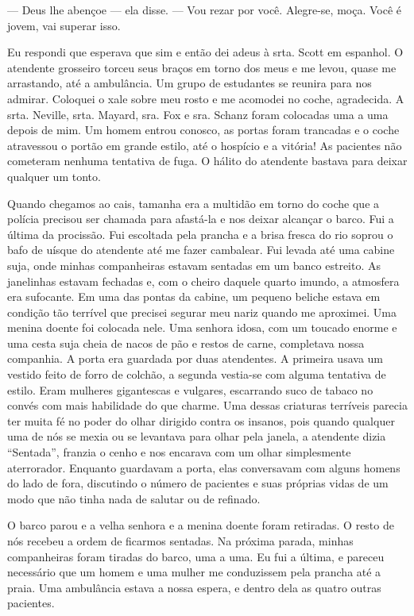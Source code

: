 --- Deus lhe abençoe --- ela disse. --- Vou
rezar por você. Alegre-se, moça. Você é jovem, vai superar isso. 

Eu respondi que esperava que sim e então dei adeus à srta. Scott em
espanhol. O atendente grosseiro torceu seus braços em torno dos meus e
me levou, quase me arrastando, até a ambulância. Um grupo de estudantes se
reunira para nos admirar. Coloquei o xale sobre meu rosto e me acomodei
no coche, agradecida. A srta. Neville, srta. Mayard, sra. Fox e sra.
Schanz foram colocadas uma a uma depois de mim. Um homem entrou conosco,
as portas foram trancadas e o coche atravessou o portão em grande
estilo, até o hospício e a vitória! As pacientes não cometeram nenhuma
tentativa de fuga. O hálito do atendente bastava para deixar qualquer um
tonto.

Quando chegamos ao cais, tamanha era a multidão em torno do coche que a
polícia precisou ser chamada para afastá-la e nos deixar alcançar o
barco. Fui a última da procissão. Fui escoltada pela prancha e a brisa
fresca do rio soprou o bafo de uísque do atendente até me fazer
cambalear. Fui levada até uma cabine suja, onde minhas companheiras
estavam sentadas em um banco estreito. As janelinhas estavam fechadas e,
com o cheiro daquele quarto imundo, a atmosfera era sufocante. Em uma
das pontas da cabine, um pequeno beliche estava em condição tão terrível
que precisei segurar meu nariz quando me aproximei. Uma menina doente
foi colocada nele. Uma senhora idosa, com um toucado enorme e uma cesta
suja cheia de nacos de pão e restos de carne, completava nossa
companhia. A porta era guardada por duas atendentes. A primeira usava um
vestido feito de forro de colchão, a segunda vestia-se com alguma tentativa de
estilo. Eram mulheres gigantescas e vulgares, escarrando suco de tabaco
no convés com mais habilidade do que charme. Uma dessas criaturas
terríveis parecia ter muita fé no poder do olhar dirigido contra os
insanos, pois quando qualquer uma de nós se mexia ou se levantava para
olhar pela janela, a atendente dizia ``Sentada'', franzia o cenho e nos
encarava com um olhar simplesmente aterrorador. Enquanto guardavam a
porta, elas conversavam com alguns homens do lado de fora, discutindo o
número de pacientes e suas próprias vidas de um modo que não tinha nada
de salutar ou de refinado.


O barco parou e a velha senhora e a menina doente foram retiradas. O resto
de nós recebeu a ordem de ficarmos sentadas. Na próxima parada, minhas
companheiras foram tiradas do barco, uma a uma. Eu fui a última, e
pareceu necessário que um homem e uma mulher me conduzissem pela prancha
até a praia. Uma ambulância estava a nossa espera, e dentro dela as
quatro outras pacientes.

